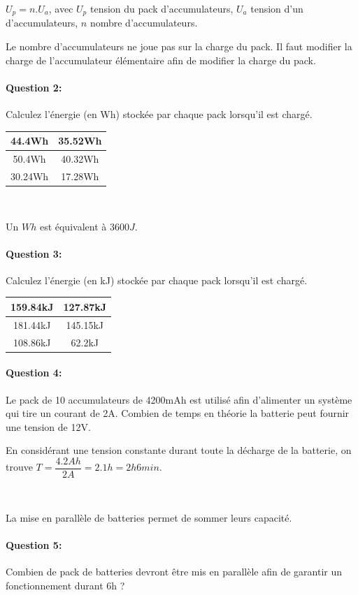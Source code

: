 $U_p=n.U_a$, avec $U_p$ tension du pack d'accumulateurs, $U_a$ tension d'un d'accumulateurs, $n$ nombre d'accumulateurs.

Le nombre d'accumulateurs ne joue pas sur la charge du pack. Il faut modifier la charge de l'accumulateur élémentaire afin de modifier la charge du pack.

\paragraph{Question 2:} Calculez l'énergie (en Wh) stockée par chaque pack lorsqu'il est chargé.

\begin{tabular}{|c|c|}
\hline
 44.4Wh & 35.52Wh \\
\hline
 50.4Wh & 40.32Wh \\
\hline
 30.24Wh & 17.28Wh \\
\hline
\end{tabular}

~\

Un $Wh$ est équivalent à $3600J$.

\paragraph{Question 3:} Calculez l'énergie (en kJ) stockée par chaque pack lorsqu'il est chargé.

\begin{tabular}{|c|c|}
\hline
 159.84kJ & 127.87kJ \\
\hline
181.44kJ & 145.15kJ \\
\hline
108.86kJ & 62.2kJ \\
\hline
\end{tabular}

\paragraph{Question 4:} Le pack de 10 accumulateurs de 4200mAh est utilisé afin d'alimenter un système qui tire un courant de 2A. Combien de temps en théorie la batterie peut fournir une tension de 12V.

En considérant une tension constante durant toute la décharge de la batterie, on trouve $T=\dfrac{4.2Ah}{2A}=2.1h=2h6min$.

~\

La mise en parallèle de batteries permet de sommer leurs capacité. 

\paragraph{Question 5:} Combien de pack de batteries devront être mis en parallèle afin de garantir un fonctionnement durant 6h ?

